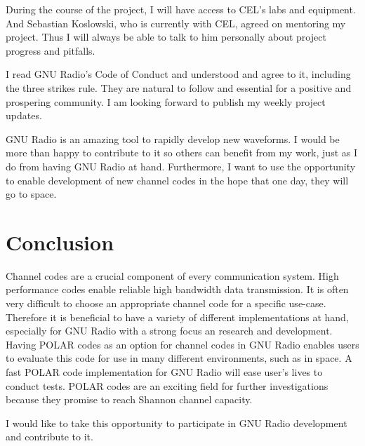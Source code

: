 \documentclass[a4paper,12pt]{scrartcl}
\begin{document}
During the course of the project, I will have access to CEL's labs and equipment.
And Sebastian Koslowski, who is currently with CEL, agreed on mentoring my project.
Thus I will always be able to talk to him personally about project progress and pitfalls.

I read GNU Radio's Code of Conduct and understood and agree to it, including the three strikes rule.
They are natural to follow and essential for a positive and prospering community.
I am looking forward to publish my weekly project updates.

GNU Radio is an amazing tool to rapidly develop new waveforms.
I would be more than happy to contribute to it so others can benefit from my work, just as I do from having GNU Radio at hand.
Furthermore, I want to use the opportunity to enable development of new channel codes in the hope that one day, they will go to space.

\section{Conclusion}
Channel codes are a crucial component of every communication system.
High performance codes enable reliable high bandwidth data transmission.
It is often very difficult to choose an appropriate channel code for a specific use-case.
Therefore it is beneficial to have a variety of different implementations at hand, especially for GNU Radio with a strong focus an research and development.
Having POLAR codes as an option for channel codes in GNU Radio enables users to evaluate this code for use in many different environments, such as in space.
A fast POLAR code implementation for GNU Radio will ease user's lives to conduct tests.
POLAR codes are an exciting field for further investigations because they promise to reach Shannon channel capacity.

I would like to take this opportunity to participate in GNU Radio development and contribute to it.


\newpage
\appendix

%  
%  
%  
  
\end{document}

